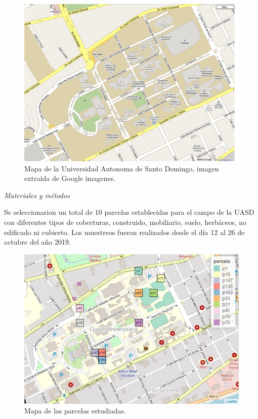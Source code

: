\documentclass[11pt,]{article}
\begin{document}
\begin{figure}
\centering
\includegraphics{uasd.jpg}
\caption{Mapa de la Universidad Autonoma de Santo Domingo, imagen
extraída de Google imagenes.}
\end{figure}

\emph{Materiales y métodos}

Se seleccionarion un total de 10 parcelas establecidas para el campo de
la UASD con diferentes tipos de coberturas, construido, mobiliario,
suelo, herbáceos, no edificado ni cubierto. Los muestreos fueron
realizados desde el día 12 al 26 de octubre del año 2019.

\begin{figure}
\centering
\includegraphics{parcelas estudiadas.jpg}
\caption{Mapa de las parcelas estudiadas.}
\end{figure}
\end{document}
